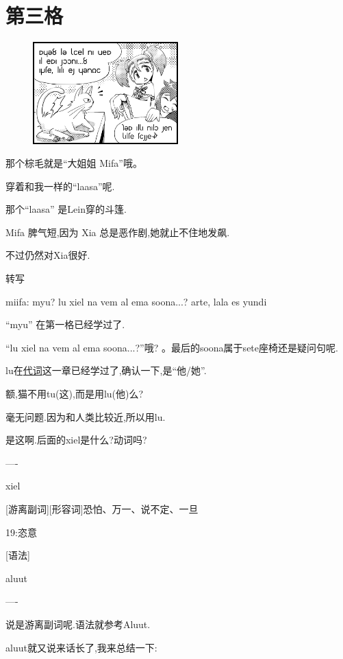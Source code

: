 \chapter{第三格}
\begin{figure}[H]
\includegraphics[width=0.5\textwidth]{ARKA/uni3.png}%
\end{figure}


那个棕毛就是``大姐姐 Mifa''哦。

穿着和我一样的``laasa''呢.


那个``laasa'' 是Lein穿的斗篷.


Mifa 脾气短,因为 Xia 总是恶作剧,她就止不住地发飙.

不过仍然对Xia很好.

\FiveStar 转写

miifa: myu? lu xiel na vem al ema soona...? arte, lala es yundi


``myu'' 在第一格已经学过了.

``lu xiel na vem al ema soona...?''哦?
。最后的soona属于sete座椅还是疑问句呢.

lu在\hyperlink{chapter-pronouns}{代词}这一章已经学过了,确认一下,是``他/她''.

额,猫不用tu(这),而是用lu(他)么?



毫无问题.因为和人类比较近,所以用lu.


是这啊.后面的xiel是什么?动词吗?

----

xiel

[游离副词][形容词]恐怕、万一、说不定、一旦

19:恣意

[语法]

aluut

----

说是游离副词呢.语法就参考Aluut.

aluut就又说来话长了,我来总结一下:

